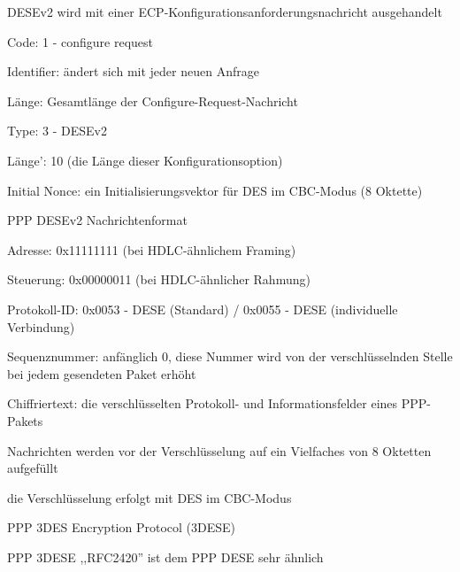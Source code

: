 \documentclass[a4paper]{article}
\begin{document}
\begin{multicols}{3}
\begin{itemize*}
\begin{itemize*}
                  \item DESEv2 wird mit einer ECP-Konfigurationsanforderungsnachricht ausgehandelt
                  \item Code: 1 - configure request
                  \item Identifier: ändert sich mit jeder neuen Anfrage
                  \item Länge: Gesamtlänge der Configure-Request-Nachricht
                  \item Type: 3 - DESEv2
                  \item Länge': 10 (die Länge dieser Konfigurationsoption)
                  \item Initial Nonce: ein Initialisierungsvektor für DES im CBC-Modus (8 Oktette)
            \end{itemize*}
            \item PPP DESEv2 Nachrichtenformat
            \begin{itemize*}
                  \item Adresse: 0x11111111 (bei HDLC-ähnlichem Framing)
                  \item Steuerung: 0x00000011 (bei HDLC-ähnlicher Rahmung)
                  \item Protokoll-ID: 0x0053 - DESE (Standard) / 0x0055 - DESE (individuelle Verbindung)
                  \item Sequenznummer: anfänglich 0, diese Nummer wird von der verschlüsselnden Stelle bei jedem gesendeten Paket erhöht
                  \item Chiffriertext: die verschlüsselten Protokoll- und Informationsfelder eines PPP-Pakets
                  \begin{itemize*}
                        \item Nachrichten werden vor der Verschlüsselung auf ein Vielfaches von 8 Oktetten aufgefüllt
                        \item die Verschlüsselung erfolgt mit DES im CBC-Modus
                  \end{itemize*}
            \end{itemize*}
            \item PPP 3DES Encryption Protocol (3DESE)
            \begin{itemize*}
                  \item PPP 3DESE ,,RFC2420'' ist dem PPP DESE sehr ähnlich

\end{itemize*}
\end{itemize*}
\end{multicols}
\end{document}
